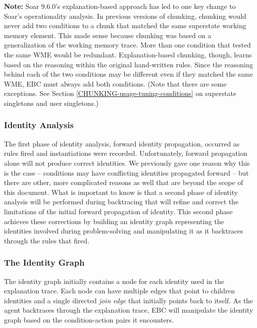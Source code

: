 \textbf{Note:} Soar 9.6.0's explanation-based approach has led to one key change to Soar's operationality analysis.  In previous versions of chunking, chunking would never add two conditions to a chunk that matched the same superstate working memory element.  This made sense because chunking was based on a generalization of the working memory trace.  More than one condition that tested the same WME would be redundant.  Explanation-based chunking, though, learns based on the reasoning within the original hand-written rules.  Since the reasoning behind each of the two conditions may be different even if they matched the same WME, EBC must always add both conditions.  (Note that there are some exceptions. See Section \ref{CHUNKING-usage-tuning-conditions} on superstate singletons and user singletons.)

\subsubsection{Identity Analysis}

The first phase of identity analysis, forward identity propagation, occurred as rules fired and instantiations were recorded.  Unfortunately, forward propagation alone will not produce correct identities.  We previously gave one reason why this is the case -- conditions may have conflicting identities propagated forward -- but there are other, more complicated reasons as well that are beyond the scope of this document. What is important to know is that a second phase of identity analysis will be performed during backtracing that will refine and correct the limitations of the initial forward propagation of identity. This second phase achieves these corrections by building an identity graph representing the identities involved during problem-solving and manipulating it as it backtraces through the rules that fired.

\subsubsection*{The Identity Graph}

The identity graph initially contains a node for each identity used in the explanation trace.  Each node can have multiple edges that point to children identities and a single directed \textit{join edge} that initially points back to itself.  As the agent backtraces through the explanation trace, EBC will manipulate the identity graph based on the condition-action pairs it encounters.

